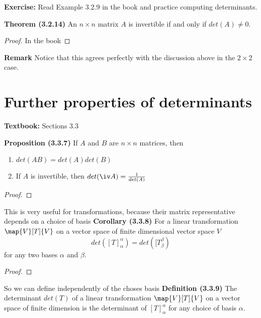 \documentclass[letterpaper, 10pt]{article}
\begin{document}
\newpage

\lb
\textbf{Exercise: } Read Example 3.2.9 in the book and practice computing determinants.
\lb

\vspace{100pt}
\lb
\textbf{Theorem (3.2.14)}
\lb
An $n \times n$ matrix $A$ is invertible if and only if $det(A) \neq 0$.
\begin{proof}
    In the book
\end{proof}

\lb
\textbf{Remark}
\lb
Notice that this agrees perfectly with the discussion above in the $2\times 2$ case.











\newpage
\section*{Further properties of determinants}%
\textbf{Textbook:} Sections 3.3


\lb
\textbf{Proposition (3.3.7)}
\lb
If $A$ and $B$ are $n \times n$ matrices, then
\begin{enumerate}
    \item $ det(AB) = det(A) det(B) $
    \item If $A$ is invertible, then $ det(\iv A) = \frac{1}{det(A)} $
\end{enumerate}
\begin{proof}
\end{proof}


This is very useful for transformations, because their matrix representative depends on a choice
of basis
\vspace{300pt}
\lb
\textbf{Corollary (3.3.8)}
\lb
For a linear transformation $\map{V}[T]{V}$ on a vector space of finite dimensional vector
space $V$
\[ det( [T]_α^α) = det([T_β^β) \]
for any two bases $α$ and $β$.
\begin{proof}
\end{proof}



\newpage
\lb
So we can define independently of the choses basis
\lb
\textbf{Definition (3.3.9)}
\lb
The determinant $det(T)$ of a linear transformation $\map{V}[T]{V}$ on a vector space of finite dimension
is the determinant of $[T]_α^α$ for any choice of basis $α$.
\end{document}

